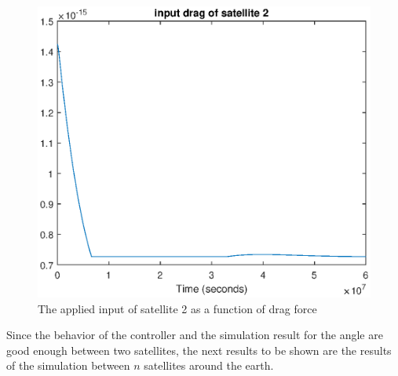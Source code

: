 %
\begin{figure}[H]
	\centering
	\includegraphics[width=0.9\linewidth]
	{figures/input_drag_sat2.eps}
	\caption{The applied input of satellite 2 as a function of drag force  }
	\label{fig:distancecontrol4}
\end{figure}
%
Since the behavior of the controller and the simulation result for the angle are  good enough between two satellites, the next results to be shown are the results of the simulation between $n$ satellites around the earth. 
%